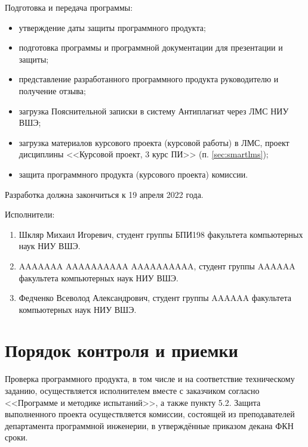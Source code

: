 \documentclass[a4paper,12pt,reqno]{article}
\begin{document}
  Подготовка и передача программы:
  \begin{itemize}
    \item утверждение даты защиты программного продукта;
    \item подготовка программы и программной документации для презентации и защиты;
    \item представление разработанного программного продукта руководителю и получение отзыва;
    \item загрузка Пояснительной записки в систему Антиплагиат через ЛМС НИУ ВШЭ;
    \item загрузка материалов курсового проекта (курсовой работы) в ЛМС, проект дисциплины <<Курсовой проект, 3 курс ПИ>> (п. \ref{sec:smartlms});
    \item защита программного продукта (курсового проекта) комиссии.
  \end{itemize}
  Разработка должна закончиться к 19 апреля 2022 года.

  Исполнители:
  \begin{enumerate}
    \item Шкляр Михаил Игоревич, студент группы БПИ198 факультета компьютерных наук НИУ ВШЭ.
    \item AAAAAAA AAAAAAAAAA AAAAAAAAAA, студент группы AAAAAA факультета компьютерных наук НИУ ВШЭ.
    \item Федченко Всеволод Александрович, студент группы AAAAAA факультета компьютерных наук НИУ ВШЭ.
  \end{enumerate}

  \section{Порядок контроля и приемки}
  Проверка программного продукта, в том числе и на соответствие техническому заданию,
  осуществляется исполнителем вместе с заказчиком согласно <<Программе и методике испытаний>>, а также пункту 5.2.
  Защита выполненного проекта осуществляется комиссии, состоящей из преподавателей департамента программной инженерии,
  в утверждённые приказом декана ФКН сроки.

  \begin{CRTbibliography}
  \end{CRTbibliography}

  \CRTlistRegistration
\end{document}
